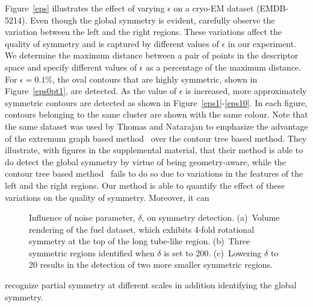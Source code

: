 \documentclass[review,journal]{vgtc}         %
\begin{document}
Figure~\ref{eps} illustrates the effect of varying $\epsilon$ on a cryo-EM dataset (EMDB-5214).
Even though the global symmetry is evident, carefully observe the variation between the left
and the right regions. These variations affect the quality of symmetry and is captured by
different values of $\epsilon$ in our experiment. We determine the maximum distance between a
pair of points in the descriptor space and specify different values of $\epsilon$ as a percentage
of the maximum distance. For $\epsilon=0.1$\%, the oval contours that are highly symmetric, shown in 
Figure~\ref{eps0pt1}, are detected. As the value of $\epsilon$ is increased, more approximately
symmetric contours are detected as shown in Figure~\ref{eps1}-\ref{eps10}. In each figure,
contours belonging to the same cluster are shown with the same colour.
Note that the same dataset was used by Thomas and Natarajan to emphasize the advantage of
the extremum graph based method~\cite{ThomN13} over the contour tree based method. They illustrate, 
with figures in the supplemental material, that their method is able to do detect
the global symmetry by virtue of being geometry-aware, while the contour tree based method~\cite{ThomN11} 
fails to do so due to variations in the features of the left and the right regions. Our method is able
to quantify the effect of these variations on the quality of symmetry. Moreover, it can
\begin{figure}[t]
	\centering
	\caption{\label{delta}Influence of noise parameter, $\delta$, on symmetry detection. (a)~Volume rendering of 
		the fuel dataset, which exhibits 4-fold rotational symmetry at the top of the long tube-like region.
		(b)~Three symmetric regions identified when $\delta$ is set to 200. (c)~Lowering
	$\delta$ to 20 results in the detection of two more smaller symmetric regions.}
\end{figure}
recognize partial symmetry at different scales in addition identifying the global symmetry.
\end{document}
